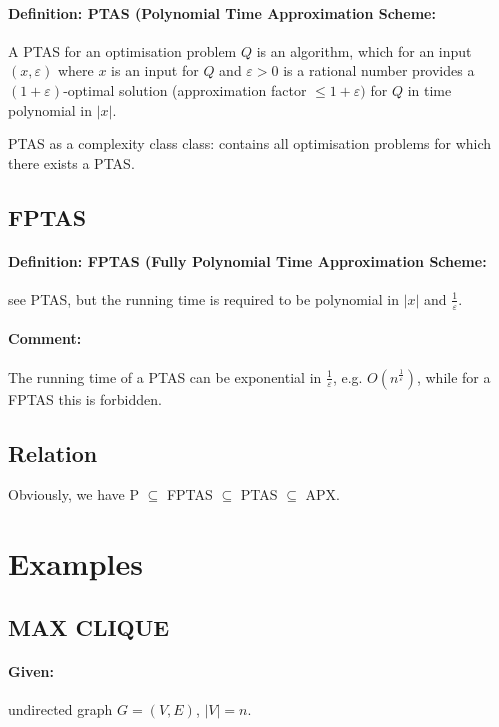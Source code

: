 \documentclass[11pt]{article}
\theoremstyle{definition}
\theoremstyle{definition}
\begin{document}
\paragraph{Definition: PTAS (Polynomial Time Approximation Scheme:}

A PTAS for an optimisation problem $ Q $ is an algorithm, which for an input $ (x, \varepsilon) $ where $ x $ is an input for $ Q $ and $ \varepsilon > 0 $ is a rational number provides a $ (1 + \varepsilon) $-optimal solution (approximation factor $ \leq 1 + \varepsilon) $ for $ Q $ in time polynomial in $ |x| $.

PTAS as a complexity class class: contains all optimisation problems for which there exists a PTAS.

\subsection{FPTAS}
\paragraph{Definition: FPTAS (Fully Polynomial Time Approximation Scheme:}
see PTAS, but the running time is required to be polynomial in $ |x | $ and $ \frac{1}{\varepsilon} $.

\paragraph{Comment:} The running time of a PTAS can be exponential in $ \frac{1}{\varepsilon} $, e.g. $ O(n^{ \frac{1}{\varepsilon}}) $, while for a FPTAS this is forbidden.

\subsection{Relation}
Obviously, we have P $ \subseteq $ FPTAS $ \subseteq $ PTAS $ \subseteq $ APX.

\section{Examples}
\subsection{MAX CLIQUE}

\paragraph{Given:} undirected graph $ G = (V, E) $, $ |V| = n $.
\end{document}
